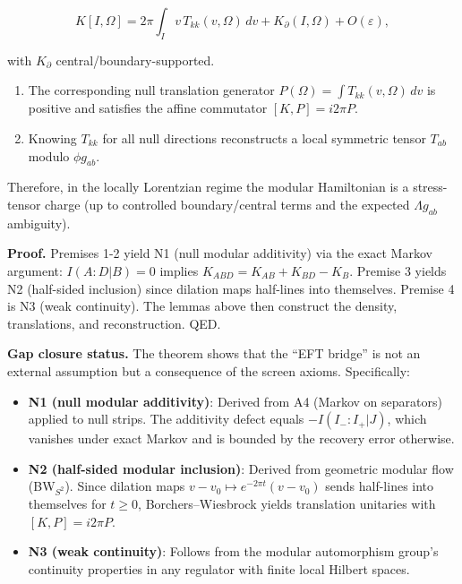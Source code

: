 \documentclass[
]{article}
\begin{document}
\[
K[I,\Omega] = 2\pi \int_I v \, T_{kk}(v,\Omega) \, dv + K_\partial(I,\Omega) + O(\varepsilon),
\]

with \(K_\partial\) central/boundary-supported.

\begin{enumerate}
\def\labelenumi{(\alph{enumi})}
\setcounter{enumi}{1}
\item
  The corresponding null translation generator
  \(P(\Omega) = \int T_{kk}(v,\Omega) \, dv\) is positive and satisfies
  the affine commutator \([K,P] = i 2\pi P\).
\item
  Knowing \(T_{kk}\) for all null directions reconstructs a local
  symmetric tensor \(T_{ab}\) modulo \(\phi g_{ab}\).
\end{enumerate}

Therefore, in the locally Lorentzian regime the modular Hamiltonian is a
stress-tensor charge (up to controlled boundary/central terms and the
expected \(\Lambda g_{ab}\) ambiguity).

\textbf{Proof.} Premises 1-2 yield N1 (null modular additivity) via the
exact Markov argument: \(I(A:D|B)=0\) implies
\(K_{ABD} = K_{AB} + K_{BD} - K_B\). Premise 3 yields N2 (half-sided
inclusion) since dilation maps half-lines into themselves. Premise 4 is
N3 (weak continuity). The lemmas above then construct the density,
translations, and reconstruction. QED.

\textbf{Gap closure status.} The theorem shows that the ``EFT bridge''
is not an external assumption but a consequence of the screen axioms.
Specifically:

\begin{itemize}
\item
  \textbf{N1 (null modular additivity)}: Derived from A4 (Markov on
  separators) applied to null strips. The additivity defect equals
  \(-I(I_-:I_+|J)\), which vanishes under exact Markov and is bounded by
  the recovery error otherwise.
\item
  \textbf{N2 (half-sided modular inclusion)}: Derived from geometric
  modular flow (BW\(_{S^2}\)). Since dilation maps
  \(v - v_0 \mapsto e^{-2\pi t}(v - v_0)\) sends half-lines into
  themselves for \(t \ge 0\), Borchers--Wiesbrock yields translation
  unitaries with \([K, P] = i2\pi P\).
\item
  \textbf{N3 (weak continuity)}: Follows from the modular automorphism
  group's continuity properties in any regulator with finite local
  Hilbert spaces.
\end{itemize}
\end{document}
